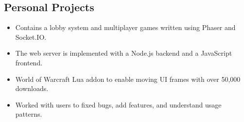 \documentclass[letterpaper]{resume}
\begin{document}
\begin{minipage}[t]{0.74\columnwidth}
\sectionspace

\subsection{Personal Projects}
\vspace{2pt}
\begin{itemize}
\item Contains a lobby system and multiplayer games written using Phaser and Socket.IO.
\item The web server is implemented with a Node.js backend and a JavaScript frontend.
\end{itemize}
\vspace{3pt}
\vspace{2pt}
\begin{itemize}
\item World of Warcraft Lua addon to enable moving UI frames with over 50,000 downloads.
\item Worked with users to fixed bugs, add features, and understand usage patterns.
\end{itemize}

\sectionspace

\end{minipage}
\end{document}
